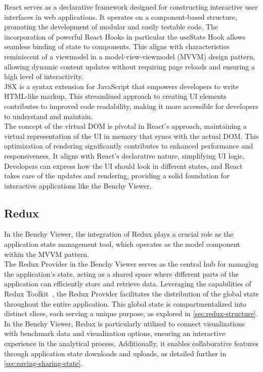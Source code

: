 React serves as a declarative framework designed for constructing interactive user interfaces in web applications. It operates on a component-based structure, promoting the development of modular and easily testable code. The incorporation of powerful React Hooks \parencite*{react-hooks} in particular the useState Hook \parencite*{react-useState} allows seamless binding of state to components. This aligns with characteristics reminiscent of a viewmodel in a model-view-viewmodel (MVVM) design pattern, allowing dynamic content updates without requiring page reloads and ensuring a high level of interactivity.\\
JSX \parencite*{react-jsx} is a syntax extension for JavaScript that empowers developers to write HTML-like markup. This streamlined approach to creating UI elements contributes to improved code readability, making it more accessible for developers to understand and maintain.\\
The concept of the virtual DOM \parencite*{react-virtual-dom} is pivotal in React's approach, maintaining a virtual representation of the UI in memory that syncs with the actual DOM. This optimization of rendering significantly contributes to enhanced performance and responsiveness. It aligns with React's declarative nature, simplifying UI logic. Developers can express how the UI should look in different states, and React takes care of the updates and rendering, providing a solid foundation for interactive applications like the Benchy Viewer.

\subsection{Redux}\label{sec:redux}

In the Benchy Viewer, the integration of Redux plays a crucial role as the application state management tool, which operates as the model component within the MVVM pattern.\\ 
The Redux Provider in the Benchy Viewer serves as the central hub for managing the application's state, acting as a shared space where different parts of the application can efficiently store and retrieve data. Leveraging the capabilities of Redux Toolkit~\parencite{redux-toolkit}, the Redux Provider facilitates the distribution of the global state throughout the entire application. This global state is compartmentalized into distinct slices, each serving a unique purpose, as explored in \ref{sec:redux-structure}.\\
In the Benchy Viewer, Redux is particularly utilized to connect visualizations with benchmark data and visualization options, ensuring an interactive experience in the analytical process. Additionally, it enables collaborative features through application state downloads and uploads, as detailed further in \ref*{sec:saving-sharing-state}.

